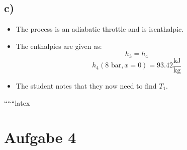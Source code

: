 

\subsection*{c)}

\begin{itemize}
    \item The process is an adiabatic throttle and is isenthalpic.
    \item The enthalpies are given as:
    \[
    h_3 = h_4
    \]
    \[
    h_4 \left( 8 \text{ bar}, x = 0 \right) = 93.42 \frac{\text{kJ}}{\text{kg}}
    \]
    \item The student notes that they now need to find $T_1$.
\end{itemize}

``````latex


\section*{Aufgabe 4}